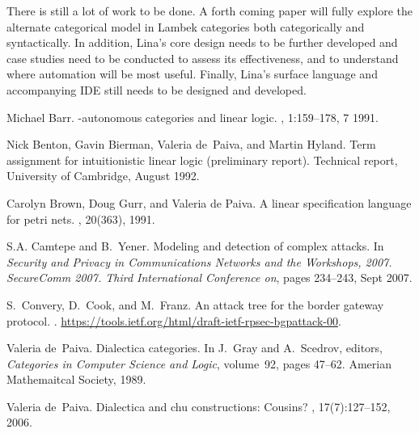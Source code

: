 \documentclass{sigplanconf}
\begin{document}
There is still a lot of work to be done.  A forth coming paper will
fully explore the alternate categorical model in Lambek categories
both categorically and syntactically.  In addition, Lina's core design
needs to be further developed and case studies need to be conducted to
assess its effectiveness, and to understand where automation will be
most useful.  Finally, Lina's surface language and accompanying IDE
still needs to be designed and developed.



\begin{thebibliography}{10}
  \softraggedright

Michael Barr.
\newblock *-autonomous categories and linear logic.
, 1:159--178, 7
  1991.

Nick Benton, Gavin Bierman, Valeria de~Paiva, and Martin Hyland.
\newblock Term assignment for intuitionistic linear logic (preliminary report).
\newblock Technical report, University of Cambridge, August 1992.  
  
Carolyn Brown, Doug Gurr, and Valeria de Paiva.
\newblock A linear specification language for petri nets.
, 20(363), 1991.

S.A. Camtepe and B.~Yener.
\newblock Modeling and detection of complex attacks.
\newblock In {\em Security and Privacy in Communications Networks and the
  Workshops, 2007. SecureComm 2007. Third International Conference on}, pages
  234--243, Sept 2007.

S.~Convery, D.~Cook, and M.~Franz.
\newblock An attack tree for the border gateway protocol.
.
\newblock \url{https://tools.ietf.org/html/draft-ietf-rpsec-bgpattack-00}.

Valeria de~Paiva.
\newblock Dialectica categories.
\newblock In J.~Gray and A.~Scedrov, editors, {\em Categories in Computer
  Science and Logic}, volume~92, pages 47--62. Amerian Mathemaitcal Society,
  1989.

Valeria de~Paiva.
\newblock Dialectica and chu constructions: Cousins?
, 17(7):127--152, 2006.


\end{thebibliography}
\end{document}
